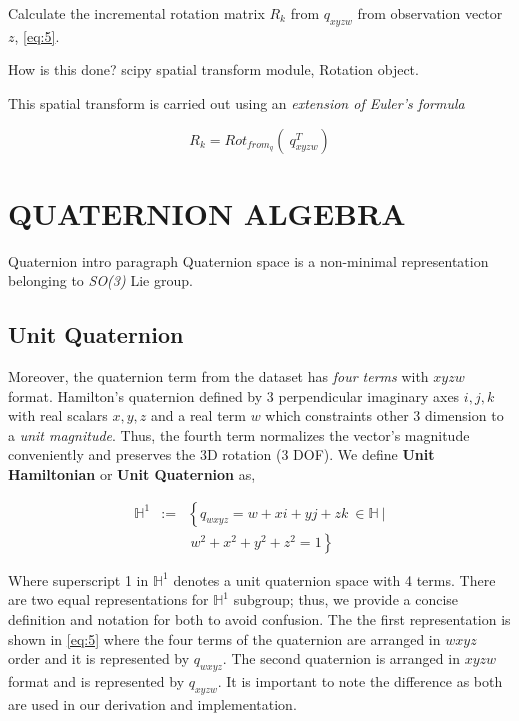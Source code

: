 \documentclass[letterpaper, 10 pt, conference]{ieeeconf}  %
\newcommand{\transpose}[1]{\ensuremath{#1^{\scriptscriptstyle T}}}
\begin{document}
Calculate the incremental rotation matrix $R_k$ from $q_{xyzw}$ from observation
vector $z$, \ref{eq:5}.

How is this done? scipy spatial transform module, Rotation object.

This spatial transform is carried out using an \textit{extension of Euler's formula}

\begin{equation}
\label{eq:11}
R_{k} = Rot_{from_q} \left( ~\transpose{q_{xyzw} } \right)
\end{equation}



\section{QUATERNION ALGEBRA}

Quaternion intro paragraph
Quaternion space is a non-minimal representation belonging to \textit{SO(3)} Lie group.

\subsection{Unit Quaternion}
Moreover, the quaternion term from the dataset has \textit{four terms} with $xyzw$
format.
Hamilton's quaternion defined by 3 perpendicular imaginary axes $i,j,k$ with
real scalars $x,y,z$ and a real term $w$ which constraints other 3 dimension to
a \textit{unit magnitude}. Thus, the fourth term normalizes the vector's magnitude
conveniently and preserves the 3D rotation (3 DOF). We define \textbf{Unit Hamiltonian}
or \textbf{Unit Quaternion} as,


\begin{eqnarray}\nonumber
\label{eq:9}
\mathbb{H}^{1} &:=&\left\{ q_{wxyz}=w+xi+yj+zk~\in \mathbb{H}~| \right.\\
                   && \left.~w^{2}+x^{2}+y^{2}+z^{2}=1 \right\}
\end{eqnarray}

Where superscript 1 in $\mathbb{H}^{1}$ denotes a unit quaternion space with 4
terms. There are two equal representations for $\mathbb{H}^{1}$ subgroup; thus,
we provide a concise definition and notation for both to avoid confusion. The
the first representation is shown in \ref{eq:5} where the four terms of the
quaternion are arranged in $wxyz$ order and it is represented by $q_{wxyz}$.
The second quaternion is arranged in $xyzw$ format and is represented by $q_{xyzw}$.
It is important to note the difference as both are used in our derivation and
implementation.
\end{document}
